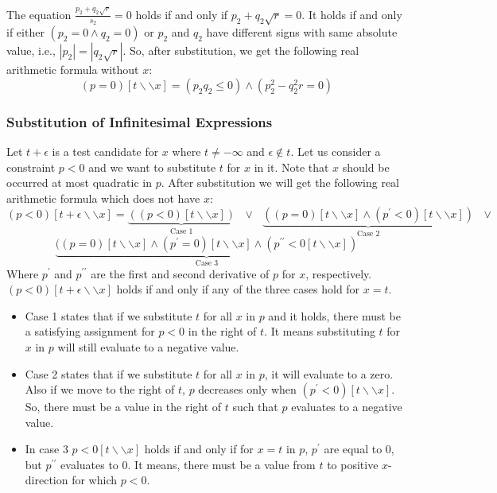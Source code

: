The equation $\frac{p_{2}+q_{2}\sqrt{r}}{s_{2}} = 0$ holds if and only if $p_{2}+q_{2}\sqrt{r} = 0$. It holds if and only if either $(p_{2} = 0\wedge q_{2} = 0)$ or $p_{2}$ and $q_{2}$ have different signs with same absolute value, i.e., $|p_{2}|=|q_{2}\sqrt{r}|$. So, after substitution, we get the following real arithmetic formula without $x$:
$$ (p = 0)[t\backslash\backslash x] = (p_{2}q_{2}\leq 0) \wedge (p_{2}^{2} - q_{2}^{2} r = 0) $$
\subsubsection{Substitution of Infinitesimal Expressions}
Let $t+\epsilon$ is a test candidate for $x$ where $t\neq - \infty$ and $\epsilon \notin t$. Let us consider a constraint $p<0$ and we want to substitute $t$ for $x$ in it. Note that $x$ should be occurred at most quadratic in $p$. After substitution we will get the following real arithmetic formula which does not have $x$:
$$(p<0)[t+\epsilon\backslash\backslash x]=\underbrace{((p<0)[t\backslash\backslash x])}\limits_{\text{Case 1}} \text{ }\vee\text{ }\underbrace{((p=0)[t\backslash\backslash x]\wedge(p^{\prime}<0)[t\backslash\backslash x])}\limits_{\text{Case 2}}\text{ }\vee$$
$$\underbrace{((p=0)[t\backslash\backslash x]\wedge(p^{\prime}=0)[t\backslash\backslash x]\wedge (p^{\prime\prime}<0[t\backslash\backslash x])}\limits_{\text{Case 3}} $$
Where $p^{\prime}$ and $p^{\prime\prime}$ are the first and second derivative of $p$ for $x$, respectively. $(p<0)[t+\epsilon\backslash\backslash x]$ holds if and only if any of the three cases hold for $x=t$.
\begin{itemize}
	\item Case 1 states that if we substitute $t$ for all $x$ in $p$ and it holds, there must be a satisfying assignment for $p<0$ in the right of $t$. It means substituting $t$ for $x$ in $p$ will still evaluate to a negative value.
	\item Case 2 states that if we substitute $t$ for all $x$ in $p$, it will evaluate to a zero. Also if we move to the right of $t$, $p$ decreases only when $(p^{\prime}<0)[t\backslash\backslash x]$. So, there must be a value in the right of $t$ such that $p$ evaluates to a negative value.
	\item In case 3 $p<0[t\backslash\backslash x]$ holds if and only if for $x = t$ in $p$, $p^{\prime}$ are equal to $0$, but $p^{\prime\prime}$ evaluates to $0$. It means, there must be a value from $t$ to positive $x$-direction for which $p<0$.
\end{itemize}
